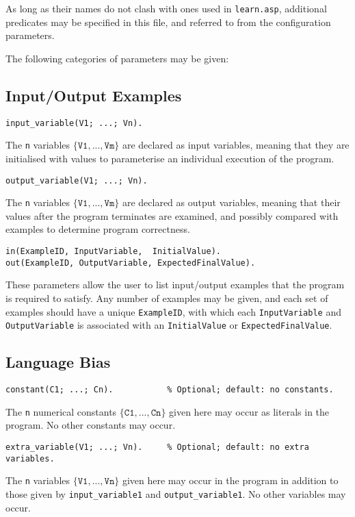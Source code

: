 \documentclass[a4paper,twoside,notitlepage]{report}
\newcommand{\ttt}{\texttt}
\begin{document}
As long as their names do not clash with ones used in \verb|learn.asp|, 
additional predicates may be specified in this file, and referred to from 
the configuration parameters.

The following categories of parameters may be given:

\subsection{Input/Output Examples}

\begin{Verbatim}[samepage=true]
input_variable(V1; ...; Vn).
\end{Verbatim}
The \ttt{n} variables $\{\ttt{V1}, ..., \ttt{Vm}\}$ are declared as input 
variables, meaning that they are initialised with values to parameterise an 
individual execution of the program.

\begin{Verbatim}[samepage=true]
output_variable(V1; ...; Vn).
\end{Verbatim}
The \ttt{n} variables $\{\ttt{V1}, ..., \ttt{Vm}\}$ are declared as output
variables, meaning that their values after the program terminates are examined, and 
possibly compared with examples to determine program correctness.

\begin{Verbatim}[samepage=true]
 in(ExampleID, InputVariable,  InitialValue).
out(ExampleID, OutputVariable, ExpectedFinalValue).
\end{Verbatim}
These parameters allow the user to list input/output examples that the program 
is required to satisfy. Any number of examples may be given, and each set of 
examples should have a unique \ttt{ExampleID}, with which each 
\ttt{InputVariable} and \ttt{OutputVariable} is associated with an 
\ttt{InitialValue} or \ttt{ExpectedFinalValue}.

\subsection{Language Bias} \label{sec:synexm_spclng_bias}
\begin{Verbatim}[samepage=true]
constant(C1; ...; Cn).           % Optional; default: no constants.
\end{Verbatim}
The \ttt{n} numerical constants $\{\ttt{C1}, ..., \ttt{Cn}\}$ 
given here may occur as literals in the program. No other constants may occur.

\begin{Verbatim}[samepage=true]
extra_variable(V1; ...; Vn).     % Optional; default: no extra variables.
\end{Verbatim}
The \texttt{n} variables $\{\ttt{V1}, ..., \ttt{Vn}\}$ given here 
may occur in the program in addition to those given by \ttt{input\_variable\/1}
and \ttt{output\_variable\/1}. No other variables may occur.
\end{document}

